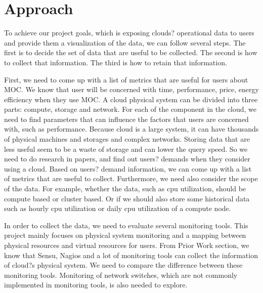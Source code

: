 \documentclass[11pt, oneside]{article}   	%
\begin{document}
\section{Approach}

To achieve our project goals, which is exposing clouds? operational data to users and provide them a visualization of the data, we can follow several steps. The first is to decide the set of data that are useful to be collected. The second is how to collect that information. The third is how to retain that information. 

	First, we need to come up with a list of metrics that are useful for users about MOC. We know that user will be concerned with time, performance, price, energy efficiency when they use MOC.  A cloud physical system can be divided into three parts: compute, storage and network. For each of the component in the cloud, we need to find parameters that can influence the factors that users are concerned with, such as performance. Because cloud is a large system, it can have thousands of physical machines and storages and complex networks. Storing data that are less useful seem to be a waste of storage and can lower the query speed. So we need to do research in papers, and find out users? demands when they consider using a cloud. Based on users? demand information, we can come up with a list of metrics that are useful to collect. Furthermore, we need also consider the scope of the data. For example, whether the data, such as cpu utilization, should be compute based or cluster based. Or if we should also store some historical data such as hourly cpu utilization or daily cpu utilization of a compute node. 
	
	In order to collect the data, we need to evaluate several monitoring tools. This project mainly focuses on physical system monitoring and a mapping between physical resources and virtual resources for users. From Prior Work section, we know that Sensu, Nagios and a lot of monitoring tools can collect the information of cloud?s physical system. We need to compare the difference between these monitoring tools. Monitoring of network switches, which are not commonly implemented in monitoring tools, is also needed to explore. 
	
\end{document}
